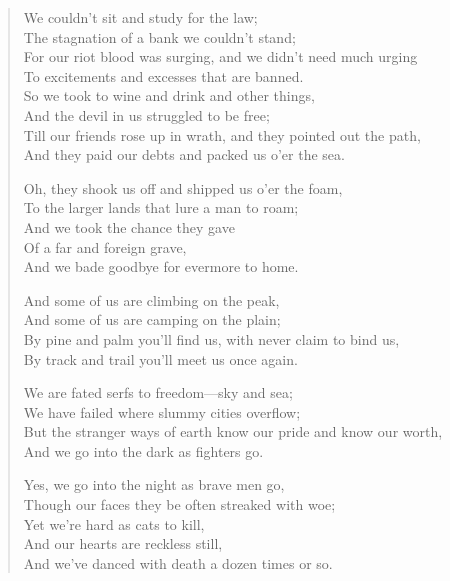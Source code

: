 

\begin{verse}
We couldn't sit and study for the law;\\
\hspace*{3em}The stagnation of a bank we couldn't stand;\\
For our riot blood was surging, and we didn't need much urging\\
To excitements and excesses that are banned.\\
So we took to wine and drink and other things,\\
\hspace*{3em}And the devil in us struggled to be free;\\
Till our friends rose up in wrath, and they pointed out the path,\\
And they paid our debts and packed us o'er the sea.

Oh, they shook us off and shipped us o'er the foam,\\
To the larger lands that lure a man to roam;\\
\hspace*{3em}And we took the chance they gave\\
\hspace*{3em}Of a far and foreign grave,\\
And we bade goodbye for evermore to home.

And some of us are climbing on the peak,\\
\hspace*{3em}And some of us are camping on the plain;\\
By pine and palm you'll find us, with never claim to bind us,\\
By track and trail you'll meet us once again.

We are fated serfs to freedom—sky and sea;\\
\hspace*{3em}We have failed where slummy cities overflow;\\
But the stranger ways of earth know our pride and know our worth,\\
And we go into the dark as fighters go.

Yes, we go into the night as brave men go,\\
Though our faces they be often streaked with woe;\\
\hspace*{3em}Yet we're hard as cats to kill,\\
\hspace*{3em}And our hearts are reckless still,\\
And we've danced with death a dozen times or so.


\end{verse}
